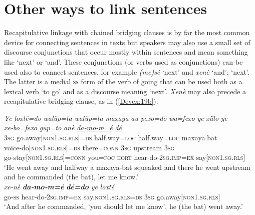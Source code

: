 \documentclass[output=paper]{LSP/langsci}
\begin{document}
	
\section{Other ways to link sentences} 
\label{Devotherways}
Recapitulative linkage with chained bridging clauses is by far the most common device for connecting sentences in   texts but speakers may also use a small set of discourse conjunctions that occur mostly within sentences and mean something like `next' or `and'. These conjunctions (or verbs used as conjunctions) can be used also to connect sentences, for example \textit{(me)sé} `next' and \textit{xenè} `and'; `next'. The latter is a medial \textsc{ss} form of the verb of going that can be used both as a lexical verb `to go' and as a discourse  meaning `next'.  \textit{Xenè} may also precede a recapitulative bridging clause, as in (\ref{Devex:19b}). 

\begin{exe}
\ex \label{Devex:19ab}
\begin{xlist}
\ex \label{Devex:19a}			     
\gll \textit{Ye} \textit{loxté=do} \textit{walüp=ta} \textit{walüp=ta} \textit{maxaya} \textit{au‑pexo=do} \textit{wa=fexo} \textit{ye} \textit{xülo} \textit{ye} \textit{xe‑bo=fexo} \textit{gup=to} \textit{anè} \underline{\textit{da‑mo‑m=é}} \underline{\textit{dé}}\\
\textsc{3sg} go.away[\textsc{non1.sg.rls}]=\textsc{ds} half.way=\textsc{loc} half.way=\textsc{loc} maxaya.bat voice‑do[\textsc{non1.sg.rls}]=\textsc{ds} there=\textsc{conn} \textsc{3sg} upstream \textsc{3sg} go‑stay[\textsc{non1.sg.rls}]=\textsc{conn} you=\textsc{foc} \textsc{hort} hear‑do‑\textsc{2sg.imp=ex} say[\textsc{non1.sg.rls}]\\
\glt `He went away and halfway a maxaya‑bat squeaked and there he went upstream and he commanded (the bat), let me know.'\\

\ex \label{Devex:19b}			     
\gll \textit{xe‑nè} \textbf{\textit{da‑mo‑m=é}} \textbf{\textit{dé=do}} \textit{ye} \textit{loxté} \\        		
go‑\textsc{ss} hear‑do‑\textsc{2sg.imp=ex} say.\textsc{non1.sg.rls=ds} \textsc{3sg} go.away[\textsc{non1.sg.rls}]\\
\glt `And after he commanded, `you should let me know', he (the bat) went away.'\\ 
\end{xlist}
\end{exe}
\end{document}
